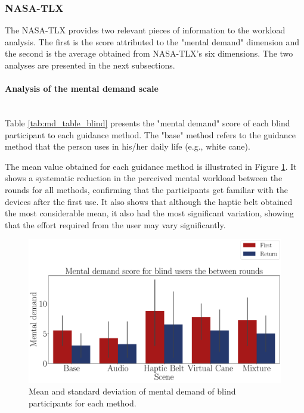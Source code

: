 \subsubsection{NASA-TLX}
\label{subsubsec:results_nasa_tlx_1}

The NASA-TLX provides two relevant pieces of information to the workload analysis. The first is the score attributed to the "mental demand" dimension and the second is the average obtained from NASA-TLX's six dimensions. The two analyses are presented in the next subsections.

\paragraph{Analysis of the mental demand scale}\mbox{}\\

Table \ref{tab:md_table_blind} presents the "mental demand" score of each blind participant to each guidance method. The "base" method refers to the guidance method that the person uses in his/her daily life (e.g., white cane). 



The mean value obtained for each guidance method is illustrated in Figure \ref{fig:barplot_md_avg_5_scene_blind}. It shows a systematic reduction in the perceived mental workload between the rounds for all methods, confirming that the participants get familiar with the devices after the first use. It also shows that although the haptic belt obtained the most considerable mean, it also had the most significant variation, showing that the effort required from the user may vary significantly.

\begin{figure}[!htb]
    \centering
    \includegraphics[width = \textwidth]{Resultados/Nasa/Figuras/pdf/barplot_md_avg_5_scene_blind.pdf}
    \caption{Mean and standard deviation of mental demand of blind participants for each method.}
    \label{fig:barplot_md_avg_5_scene_blind}
\end{figure}


